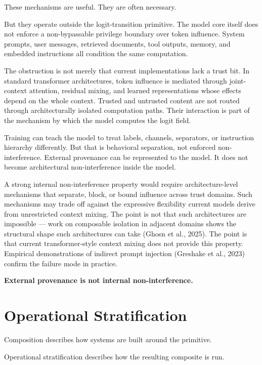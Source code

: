 \documentclass[11pt]{article}
\begin{document}
These mechanisms are useful. They are often necessary.

But they operate outside the logit-transition primitive. The model core itself does not enforce a non-bypassable privilege boundary over token influence. System prompts, user messages, retrieved documents, tool outputs, memory, and embedded instructions all condition the same computation.

The obstruction is not merely that current implementations lack a trust bit. In standard transformer architectures, token influence is mediated through joint-context attention, residual mixing, and learned representations whose effects depend on the whole context. Trusted and untrusted content are not routed through architecturally isolated computation paths. Their interaction is part of the mechanism by which the model computes the logit field.

Training can teach the model to treat labels, channels, separators, or instruction hierarchy differently. But that is behavioral separation, not enforced non-interference. External provenance can be represented to the model. It does not become architectural non-interference inside the model.

A strong internal non-interference property would require architecture-level mechanisms that separate, block, or bound influence across trust domains. Such mechanisms may trade off against the expressive flexibility current models derive from unrestricted context mixing. The point is not that such architectures are impossible --- work on composable isolation in adjacent domains shows the structural shape such architectures can take (Ghosn et al., 2025). The point is that current transformer-style context mixing does not provide this property. Empirical demonstrations of indirect prompt injection (Greshake et al., 2023) confirm the failure mode in practice.

\begin{pullquote}
\textbf{External provenance is not internal non-interference.}
\end{pullquote}

\section{Operational Stratification}

Composition describes how systems are built around the primitive.

Operational stratification describes how the resulting composite is run.
\end{document}
